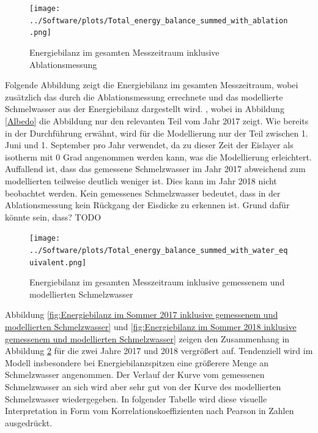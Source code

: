 \documentclass[12pt,a4paper]{article}
\begin{document}
\begin{figure}[H]
\centering
\texttt{[image: ../Software/plots/Total\_energy\_balance\_summed\_with\_ablation.png]}
\caption{Energiebilanz im gesamten Messzeitraum inklusive Ablationsmessung}
\label{fig:Energiebilanz im gesamten Messzeitraum inklusive Ablationsmessung}
\end{figure}


Folgende Abbildung zeigt die Energiebilanz im gesamten Messzeitraum, wobei zusätzlich das durch die Ablationsmessung errechnete und das modellierte Schmelwasser aus der Energiebilanz dargestellt wird. , wobei in Abbildung \ref{Albedo} die Abbildung nur den relevanten Teil vom Jahr 2017 zeigt. Wie bereits in der Durchführung erwähnt, wird für die Modellierung nur der Teil zwischen 1. Juni und 1. September pro Jahr verwendet, da zu dieser Zeit der Eislayer als isotherm mit 0 Grad angenommen werden kann, was die Modellierung erleichtert. Auffallend ist, dass das gemessene Schmelzwasser im Jahr 2017 abweichend zum modellierten teilweise deutlich weniger ist. Dies kann im Jahr 2018 nicht beobachtet werden. Kein gemessenes Schmelzwasser bedeutet, dass in der Ablationsmessung kein Rückgang der Eisdicke zu erkennen ist. Grund dafür könnte sein, dass? TODO






\begin{figure}[H]
\centering
\texttt{[image: ../Software/plots/Total\_energy\_balance\_summed\_with\_water\_equivalent.png]}
\caption{Energiebilanz im gesamten Messzeitraum inklusive gemessenem und modellierten Schmelzwasser}
\label{fig:Energiebilanz im gesamten Messzeitraum inklusive gemessenem und modellierten Schmelzwasser}
\end{figure}


Abbildung \ref{fig:Energiebilanz im Sommer 2017 inklusive gemessenem und modellierten Schmelzwasser} und \ref{fig:Energiebilanz im Sommer 2018 inklusive gemessenem und modellierten Schmelzwasser} zeigen den Zusammenhang in Abbildung \ref{fig:Energiebilanz im gesamten Messzeitraum inklusive gemessenem und modellierten Schmelzwasser} für die zwei Jahre 2017 und 2018 vergrößert auf. Tendenziell wird im Modell insbesondere bei Energiebilanzspitzen eine größerere Menge an Schmelzwasser angenommen. Der Verlauf der Kurve vom gemessenen Schmelzwasser an sich wird aber sehr gut von der Kurve des modellierten Schmelzwasser wiedergegeben. In folgender Tabelle wird diese visuelle Interpretation in Form vom Korrelationskoeffizienten nach Pearson in Zahlen ausgedrückt. 
\end{document}
